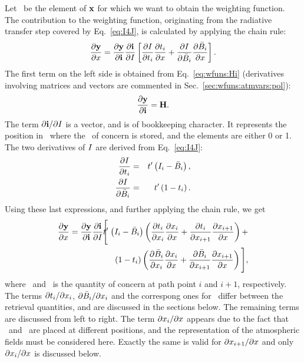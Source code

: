 Let \SttElm\ be the element of $\mathbf{x}$ for which we want to obtain the
weighting function. The contribution to the weighting function,
originating from the radiative transfer step covered by Eq.~\ref{eq:I4J}, is
calculated by applying the chain rule:
\begin{equation}
  \frac{\partial\mathbf{y}}{\partial x} =  
  \frac{\partial\mathbf{y}}{\partial\mathbf{i}}
  \frac{\partial\mathbf{i}}{\partial I} 
  \left[
  \frac{\partial I}{\partial t_{i}}\frac{\partial t_{i}}{\partial x} + 
  \frac{\partial I}{\partial\bar{B}_i}
  \frac{\partial\bar{B}_i}{\partial x} \right].
\end{equation}
The first term on the left side is obtained from Eq.~\ref{eq:wfuns:Hi}
(derivatives involving matrices and vectors are commented in
Sec.~\ref{sec:wfuns:atmvars:pol}):
\begin{equation}
  \frac{\partial\mathbf{y}}{\partial\mathbf{i}} = \mathbf{H}.
\end{equation}
The term $\partial\mathbf{i} / \partial I$ is a vector, and is of bookkeeping
character. It represents the position in \MpiVct\ where the \StoI\ of concern
is stored, and the elements are either 0 or 1.
The two derivatives of $I$ are derived from Eq.~\ref{eq:I4J}:
\begin{eqnarray}
  \frac{\partial I}{\partial t_{i}} 
      &=& t'\left(I_{i}-\bar{B}_i\right), \\
   \frac{\partial I}{\partial \bar{B}_i} &=&
   t'\left(1-t_{i}\right).
\end{eqnarray}
Using these last expressions, and further applying the chain rule, we get
\begin{eqnarray}
  \frac{\PartD\MsrVct}{\PartD\SttElm} =  
  \frac{\PartD\MsrVct}{\PartD\MpiVct}
  \frac{\PartD\MpiVct}{\PartD\StoI} \Trn'
  \!\!\!\!&\Bigg[&\!\!\!\!
      \left(\aStoI{i}-\bar{\Planck}_i\right)
      \left(
        \frac{\PartD\aTrn{i}}{\PartD\aSttElm{i}}
        \frac{\PartD\aSttElm{i}}{\PartD\SttElm} + 
        \frac{\PartD\aTrn{i}}{\PartD\aSttElm{i+1}}  
        \frac{\PartD\aSttElm{i+1}}{\PartD\SttElm} 
      \right) + \nonumber\\ && \!\!\!\!
      \left(1-\aTrn{i}\right)
      \left(
        \frac{\PartD\bar{\Planck}_i}{\PartD\aSttElm{i}}
        \frac{\PartD\aSttElm{i}}{\PartD\SttElm} + 
        \frac{\PartD\bar{\Planck}_i}{\PartD\aSttElm{i+1}}  
        \frac{\PartD\aSttElm{i+1}}{\PartD\SttElm}
     \right)
  \Bigg],  
  \label{eq:chainrule1}
\end{eqnarray}
where \ and \ is the quantity of concern at path point
$i$ and $i+1$, respectively. The terms $\partial t_{i}/\partial x_{i}$,
$\partial\bar{B}_i/\partial x_{i}$ and the correspong ones for
\ differ between the retrieval quantities, and are discussed in
the sections below. The remaining terms are discussed from left to right.
The term $\partial x_{i}/\partial x$ appears due to the fact that
\ and \SttElm\ are placed at different positions, and the
representation of the atmospheric fields must be considered here. Exactly the
same is valid for $\partial x_{i+1}/\partial x$ and only
$\partial x_{i}/\partial x$ is discussed below.


